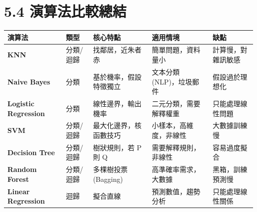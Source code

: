 \documentclass[
  letterpaper,
  DIV=11,
  numbers=noendperiod]{scrreprt}
\begin{document}
\chapter{5.4 演算法比較總結}\label{sec-algo-comparison}

\begin{longtable}[]{@{}
  >{\raggedright\arraybackslash}p{}
  >{\raggedright\arraybackslash}p{}
  >{\raggedright\arraybackslash}p{}
  >{\raggedright\arraybackslash}p{}
  >{\raggedright\arraybackslash}p{}@{}}
\toprule\noalign{}
\begin{minipage}[b]{\linewidth}\raggedright
演算法
\end{minipage} & \begin{minipage}[b]{\linewidth}\raggedright
類型
\end{minipage} & \begin{minipage}[b]{\linewidth}\raggedright
核心特點
\end{minipage} & \begin{minipage}[b]{\linewidth}\raggedright
適用情境
\end{minipage} & \begin{minipage}[b]{\linewidth}\raggedright
缺點
\end{minipage} \\
\midrule\noalign{}
\endhead
\bottomrule\noalign{}
\endlastfoot
\textbf{KNN} & 分類/迴歸 & 找鄰居，近朱者赤 & 簡單問題，資料量小 &
計算慢，對雜訊敏感 \\
\textbf{Naive Bayes} & 分類 & 基於機率，假設特徵獨立 & 文本分類
(NLP)，垃圾郵件 & 假設過於理想化 \\
\textbf{Logistic Regression} & 分類 & 線性邊界，輸出機率 &
二元分類，需要解釋權重 & 只能處理線性問題 \\
\textbf{SVM} & 分類/迴歸 & 最大化邊界，核函數技巧 &
小樣本，高維度，非線性 & 大數據訓練慢 \\
\textbf{Decision Tree} & 分類/迴歸 & 樹狀規則，若 P 則 Q &
需要解釋規則，非線性 & 容易過度擬合 \\
\textbf{Random Forest} & 分類/迴歸 & 多棵樹投票 (Bagging) &
高準確率需求，大數據 & 黑箱，訓練預測慢 \\
\textbf{Linear Regression} & 迴歸 & 擬合直線 & 預測數值，趨勢分析 &
只能處理線性關係 \\
\end{longtable}
\end{document}
